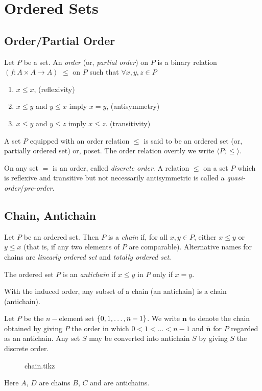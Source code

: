 \documentclass[../main-sheet.tex]{subfiles}
\begin{document}
\chapter{Ordered Sets}
\section{Order/Partial Order}
\begin{defn}
    Let \(P\) be a set. An \emph{order} (or, \emph{partial order}) on \(P\) is a binary relation \((f:A\times A\to A)\) \(\leq\) on \(P\) such that \(\forall x,y,z \in P\)
    \begin{enumerate}[label=(\roman*)]
        \item \(x\leq x\), \hspace{5cm} (reflexivity)
        \item \(x\leq y\) and \(y\leq x\) imply \(x=y\), \hspace{.75cm} (antisymmetry)
        \item \(x\leq y\) and \(y\leq z\) imply \(x\leq z\). \hspace{.75cm} (transitivity)
    \end{enumerate}
    A set \(P \) equipped with an order relation \(\leq\) is said to be an ordered set (or, partially ordered set) or, poset. The order relation overtly we write \(\langle P; \leq \rangle\).
\end{defn}
On any set \(=\) is an order, called \emph{discrete order}.
A relation \(\leq\) on a set \(P\) which is reflexive and transitive but not necessarily antisymmetric is called a \emph{quasi-order}/\emph{pre-order}.
\section{Chain, Antichain}
\begin{defn}
    Let \(P\) be an ordered set. Then \(P \) is a \emph{chain} if, for all \(x,y\in P\), either \(x\leq y\) or \(y\leq x\) (that is, if any two elements of \(P\) are comparable). Alternative names for chains are \emph{linearly ordered set} and \emph{totally ordered set}.
\end{defn}
\begin{defn}
    The ordered set \(P\) is an \emph{antichain} if \(x\leq y\) in \(P\) only if \(x=y\).
\end{defn}
\begin{note}
    With the induced order, any subset of a chain (an antichain) is a chain (antichain).
\end{note}
Let \(P\) be the \(n-\)element set \(\left\{0,1,\dots,n-1\right\}\). We write \(\mathbf{n}\) to denote the chain obtained by giving \(P\) the order in which \(0<1<\dots<n-1\) and \(\bar{\mathbf{n}}\) for \(P\) regarded as an antichain. Any set \(S\) may be converted into antichain \(\bar{S} \) by giving \(S\) the discrete order.
\begin{figure}[H]
    \centering
    {chain.tikz}
\end{figure}
Here \(A\), \(D\) are chains \(B\), \(C\) and are antichains.
\end{document}
